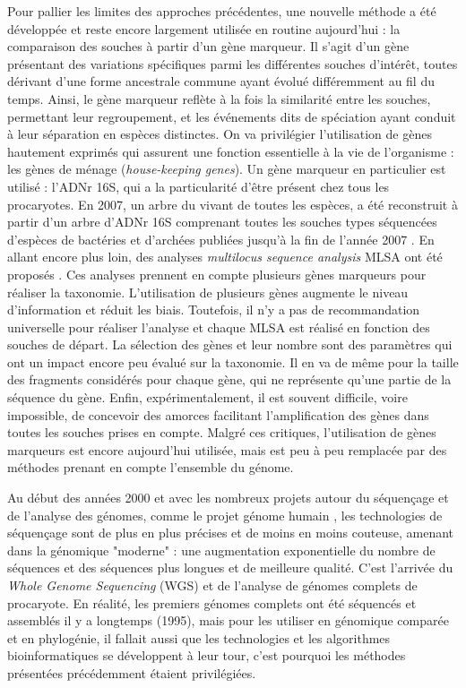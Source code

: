 Pour pallier les limites des approches précédentes, une nouvelle méthode a été développée et reste encore largement utilisée en routine aujourd'hui : la comparaison des souches à partir d'un gène marqueur. Il s'agit d'un gène présentant des variations spécifiques parmi les différentes souches d'intérêt, toutes dérivant d'une forme ancestrale commune ayant évolué différemment au fil du temps. Ainsi, le gène marqueur reflète à la fois la similarité entre les souches, permettant leur regroupement, et les événements dits de spéciation ayant conduit à leur séparation en espèces distinctes. On va privilégier l'utilisation de gènes hautement exprimés qui assurent une fonction essentielle à la vie de l'organisme : les gènes de ménage (\textit{house-keeping genes}). Un gène marqueur en particulier est utilisé : l'ADNr 16S, qui a la particularité d'être présent chez tous les procaryotes. En 2007, un arbre du vivant de toutes les espèces, a été reconstruit à partir d'un arbre d'ADNr 16S comprenant toutes les souches types séquencées d'espèces de bactéries et d'archées publiées jusqu'à la fin de l'année 2007 \cite{yarza_all-species_2008}. 
En allant encore plus loin, des analyses \textit{multilocus sequence analysis} MLSA ont été proposés \cite{glaeser_multilocus_2015}. Ces analyses prennent en compte plusieurs gènes marqueurs pour réaliser la taxonomie. L'utilisation de plusieurs gènes augmente le niveau d'information et réduit les biais. Toutefois, il n'y a pas de recommandation universelle pour réaliser l'analyse et chaque MLSA est réalisé en fonction des souches de départ. La sélection des gènes et leur nombre sont des paramètres qui ont un impact encore peu évalué sur la taxonomie. Il en va de même pour la taille des fragments considérés pour chaque gène, qui ne représente qu'une partie de la séquence du gène. Enfin, expérimentalement, il est souvent difficile, voire impossible, de concevoir des amorces facilitant l'amplification des gènes dans toutes les souches prises en compte. Malgré ces critiques, l'utilisation de gènes marqueurs est encore aujourd'hui utilisée, mais est peu à peu remplacée par des méthodes prenant en compte l'ensemble du génome.


Au début des années 2000 et avec les nombreux projets autour du séquençage et de l'analyse des génomes, comme le projet génome humain \cite{lander_initial_2001}, les technologies de séquençage sont de plus en plus précises et de moins en moins couteuse, amenant dans la génomique "moderne" : une augmentation exponentielle du nombre de séquences et des séquences plus longues et de meilleure qualité. C'est l'arrivée du \textit{Whole Genome Sequencing} (WGS) et de l'analyse de génomes complets de procaryote. En réalité, les premiers génomes complets ont été séquencés et assemblés il y a longtemps (1995), mais pour les utiliser en génomique comparée et en phylogénie, il fallait aussi que les technologies et les algorithmes bioinformatiques se développent à leur tour, c'est pourquoi les méthodes présentées précédemment étaient privilégiées.

